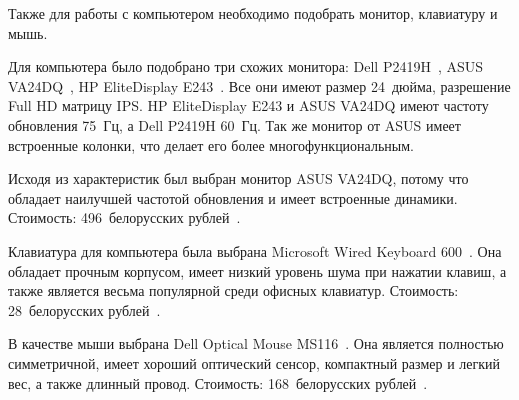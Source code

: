         
        

        
        

        

Также для работы с компьютером необходимо подобрать монитор, клавиатуру и мышь.

Для компьютера было подобрано три схожих монитора: Dell P2419H~\cite{dell_p2419h}, ASUS VA24DQ~\cite{asus_va24dq}, HP EliteDisplay E243~\cite{hp_1fh49aa}. Все они имеют размер 24~дюйма, разрешение Full HD матрицу IPS. HP EliteDisplay E243 и ASUS VA24DQ имеют частоту обновления 75~Гц, а Dell P2419H 60~Гц. Так же монитор от ASUS имеет встроенные колонки, что делает его более многофункциональным.   

Исходя из характеристик был выбран монитор ASUS VA24DQ, потому что обладает наилучшей частотой обновления и имеет встроенные динамики. Стоимость: 496~белорусских рублей~\cite{asus_va24dq}.

Клавиатура для компьютера была выбрана Microsoft Wired Keyboard 600~\cite{wired600usb}. Она обладает прочным корпусом, имеет низкий уровень шума при нажатии клавиш, а также является весьма популярной среди офисных клавиатур. Стоимость: 28~белорусских рублей~\cite{wired600usb}.

В качестве мыши выбрана Dell Optical Mouse MS116~\cite{dell_275bbcb}. Она является полностью симметричной, имеет хороший оптический сенсор, компактный размер и легкий вес, а также длинный провод. Стоимость: 168~белорусских рублей~\cite{dell_275bbcb}.

